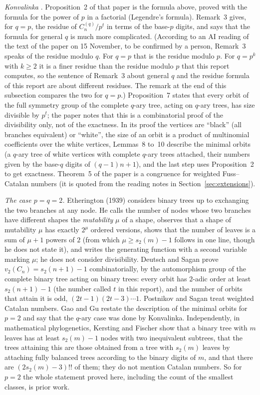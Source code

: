 \documentclass[11pt]{article}
\theoremstyle{definition}
\theoremstyle{remark}
\numberwithin{equation}{section}
\numberwithin{figure}{section}
\begin{document}
\emph{Konvalinka} \cite{Konvalinka}. Proposition~2 of that paper is the formula above, proved with the
formula for the power of $p$ in a factorial (Legendre's formula). Remark~3 gives, for $q=p$, the residue of
$C_n^{(q)}/p^{t}$ in terms of the base-$p$ digits, and says that the formula for general $q$ is much
more complicated. (According to an AI reading of the text of the paper on 15 November, to be confirmed by a
person, Remark~3 speaks of the residue modulo $q$. For $q=p$ that is the residue modulo $p$. For $q=p^k$ with
$k\ge2$ it is a finer residue than the residue modulo $p$ that this report computes, so the sentence of
Remark~3 about general $q$ and the residue formula of this report are about different residues. The remark
at the end of this subsection compares the two for $q=p$.) Proposition~7 states that every orbit of the full symmetry group of the complete $q$-ary tree,
acting on $q$-ary trees, has size divisible by $p^t$; the paper notes that this is a combinatorial proof of the
divisibility only, not of the exactness. In its proof the vertices are ``black'' (all branches equivalent) or
``white'', the size of an orbit is a product of multinomial coefficients over the white vertices, Lemmas~8
to~10 describe the minimal orbits (a $q$-ary tree of white vertices with complete $q$-ary trees attached,
their numbers given by the base-$q$ digits of $(q-1)n+1$), and the last step uses Proposition~2 to get
exactness. Theorem~5 of the paper is a congruence for weighted Fuss--Catalan numbers (it is quoted from the
reading notes in Section~\ref{sec:extensions}).

\emph{The case $p=q=2$.} Etherington \cite{Etherington} (1939) considers binary trees up to exchanging the two
branches at any node. He calls the number of nodes whose two branches have different shapes the
\emph{mutability} $\mu$ of a shape, observes that a shape of mutability $\mu$ has exactly $2^\mu$ ordered
versions, shows that the number of leaves is a sum of $\mu+1$ powers of $2$ (from which
$\mu\ge s_2(m)-1$ follows in one line, though he does not state it), and writes the generating function with a
second variable marking $\mu$; he does not consider divisibility. Deutsch and Sagan \cite{DeutschSagan} prove
$v_2(C_n)=s_2(n+1)-1$ combinatorially, by the automorphism group of the complete binary tree acting on binary
trees: every orbit has $2$-adic order at least $s_2(n+1)-1$ (the number called $t$ in this report), and the
number of orbits that attain it is odd, $(2t-1)(2t-3)\cdots1$. Postnikov and Sagan \cite{PostnikovSagan} treat weighted Catalan numbers. Gao and Gu
\cite{GaoGu} restate the description of the minimal orbits for $p=2$ and say that the $q$-ary case was done by
Konvalinka. Independently, in mathematical phylogenetics, Kersting and Fischer \cite{KerstingFischer} show that
a binary tree with $m$ leaves has at least $s_2(m)-1$ nodes with two inequivalent subtrees, that the trees
attaining this are those obtained from a tree with $s_2(m)$ leaves by attaching fully balanced trees according
to the binary digits of $m$, and that there are $(2s_2(m)-3)!!$ of them; they do not mention Catalan numbers.
So for $p=2$ the whole statement proved here, including the count of the smallest classes, is prior work.
\end{document}
